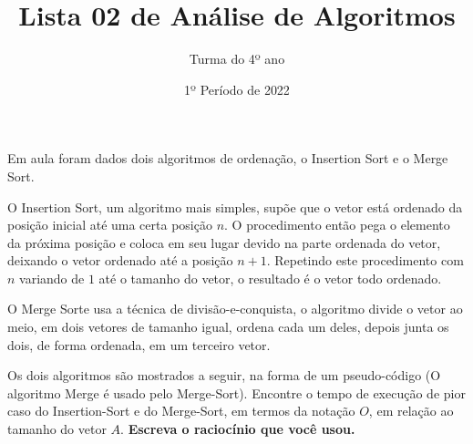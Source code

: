 \documentclass[12pt]{article}
\title{Lista 02 de Análise de Algoritmos}
\date{1º Período de 2022}
\author{Turma do 4º ano}
\begin{document}
\maketitle


\vspace{3em}

Em aula foram dados dois algoritmos de ordenação, o Insertion Sort e o Merge Sort. 

O Insertion Sort, um algoritmo mais simples, supõe que o vetor está ordenado da posição inicial até uma certa posição $n$. O procedimento então pega o elemento da próxima posição e coloca em seu lugar devido na parte ordenada do vetor, deixando o vetor ordenado até a posição $n+1$.
Repetindo este procedimento com $n$ variando de $1$ até o tamanho do vetor, o resultado é o vetor todo ordenado.

O Merge Sorte usa a técnica de divisão-e-conquista, o algoritmo divide o vetor ao meio, em dois vetores de tamanho igual, ordena cada um deles, depois junta os dois, de forma ordenada, em um terceiro vetor.

Os dois algoritmos são mostrados a seguir, na forma de um pseudo-código (O algoritmo Merge é usado pelo Merge-Sort).
Encontre o tempo de execução de pior caso do Insertion-Sort e do Merge-Sort, em termos da notação $O$, em relação ao tamanho do vetor $A$. \textbf{Escreva o raciocínio que você usou.}







\end{document}
